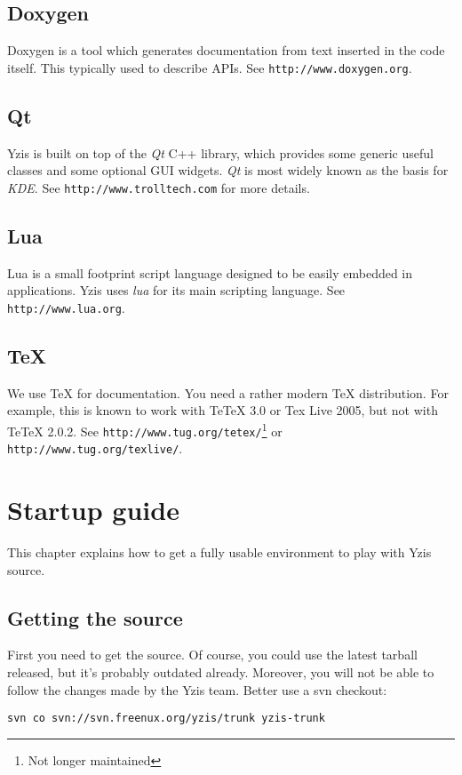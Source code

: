 \documentclass[a4paper,12pt]{report}
\begin{document}
\section{Doxygen}
Doxygen is a tool which generates documentation from text inserted in the
code itself. This typically used to describe APIs.
See \texttt{http://www.doxygen.org}.

\section{Qt}
Yzis is built on top of the \emph{Qt} C++ library, which provides some
generic useful classes and some optional GUI widgets. \emph{Qt} is most
widely known as the basis for \emph{KDE}.
See \texttt{http://www.trolltech.com} for more details.

\section{Lua}
Lua is a small footprint script language designed to be easily embedded in
applications. Yzis uses \emph{lua} for its main scripting language. See
\texttt{http://www.lua.org}.

\section{\TeX}
We use {\TeX} for documentation. You need a rather modern {\TeX} distribution.
For example, this is known to work with TeTeX 3.0 or Tex Live 2005, but not with
TeTeX 2.0.2. See \texttt{http://www.tug.org/tetex/}\footnote{Not longer
maintained} or \texttt{http://www.tug.org/texlive/}.

\chapter{Startup guide}
This chapter explains how to get a fully usable environment to play with
Yzis source.

\section{Getting the source}
First you need to get the source. Of course, you could use the latest
tarball released, but it's probably outdated already. Moreover, you will
not be able to follow the changes made by the Yzis team.
Better use a svn checkout:

\begin{verbatim}
svn co svn://svn.freenux.org/yzis/trunk yzis-trunk
\end{verbatim}
\end{document}
